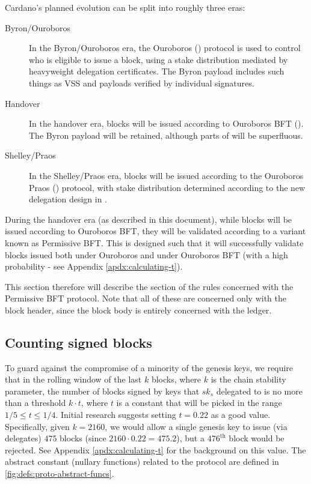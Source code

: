 \documentclass[11pt,a4paper]{article}
\newcommand{\type}[1]{\mathsf{#1}}
\begin{document}
Cardano's planned evolution can be split into roughly three eras:
\begin{description}
\item[Byron/Ouroboros] In the Byron/Ouroboros era, the Ouroboros (\cite{ouroboros})
  protocol is used to control who is eligible to issue a block, using a stake
  distribution mediated by heavyweight delegation certificates. The Byron
  payload includes such things as VSS and payloads verified by individual
  signatures.
\item[Handover] In the handover era, blocks will be issued according to
  Ouroboros BFT (\cite{ouroboros_bft}). The Byron payload will be retained, although
  parts of will be superfluous.
\item[Shelley/Praos] In the Shelley/Praos era, blocks will be issued according
  to the Ouroboros Praos (\cite{ouroboros_praos}) protocol, with stake distribution
  determined according to the new delegation design in \cite{delegation_design}.
\end{description}

During the handover era (as described in this document), while blocks will be
issued according to Ouroboros BFT, they will be validated according to a variant
known as Permissive BFT. This is designed such that it will successfully
validate blocks issued both under Ouroboros and under Ouroboros BFT (with a high
probability - see Appendix \ref{apdx:calculating-t}).

This section therefore will describe the section of the rules concerned with the
Permissive BFT protocol. Note that all of these are concerned only with the
block header, since the block body is entirely concerned with the ledger.

\subsection{Counting signed blocks}

\newcommand{\BSCEnv}{\type{BSCEnv}}
\newcommand{\BSCState}{\type{BSCState}}

To guard against the compromise of a minority of the genesis keys, we require
that in the rolling window of the last $k$ blocks, where $k$ is the chain
stability parameter, the number of blocks signed by keys that $sk_s$ delegated
to is no more than a threshold $k \cdot t$, where $t$ is a constant that will
be picked in the range $1/5 \leq t \leq 1/4$. Initial research suggests setting
$t=0.22$ as a good value. Specifically, given $k=2160$, we would allow a single
genesis key to issue (via delegates) $475$ blocks (since
$2160 \cdot 0.22 = 475.2$), but a $476^{\text{th}}$ block would be rejected.
See Appendix \ref{apdx:calculating-t} for the background on this value. The
abstract constant (nullary functions) related to the protocol are defined in
\cref{fig:defs:proto-abstract-funcs}.
\end{document}

